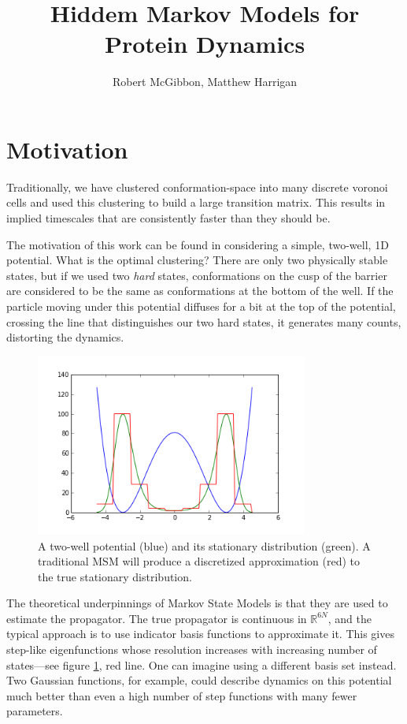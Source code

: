 \documentclass[10pt]{article}
\begin{document}
\title{Hiddem Markov Models for Protein Dynamics}
\author{Robert McGibbon, Matthew Harrigan}
\maketitle

\section{Motivation}

Traditionally, we have clustered conformation-space into many discrete
voronoi cells and used this clustering to build a large transition matrix.
This results in implied timescales that are consistently faster than they
should be. 

The motivation of this work can be found in considering a simple, two-well,
1D potential. What is the optimal clustering? There are only two physically
stable states, but if we used two \textit{hard} states, conformations on the cusp
of the barrier are considered to be the same as conformations at the bottom of the well.
If the particle moving under this potential diffuses for a bit at the top of the potential,
crossing the line that distinguishes our two hard states, it generates many counts, distorting
the dynamics. 

\begin{figure}[htbp!]
	\centering
	\includegraphics[width=0.8\textwidth]{two-well.png}
	\caption{A two-well potential (blue) and its stationary distribution (green).
	A traditional MSM will produce a discretized approximation (red) to the true stationary
	distribution.}
	\label{two-well}
\end{figure}

The theoretical underpinnings of Markov State Models is that they are used to estimate
the propagator. The true propagator is continuous in $\mathbb{R}^{6N}$, and the typical
approach is to use indicator basis functions to approximate it. This gives step-like
eigenfunctions whose resolution increases with increasing number of states---see
figure \ref{two-well}, red line.  One can imagine
using a different basis set instead. Two Gaussian functions, for example, could describe
dynamics on this potential much better than even a high number of step functions with
many fewer parameters.
\end{document}
